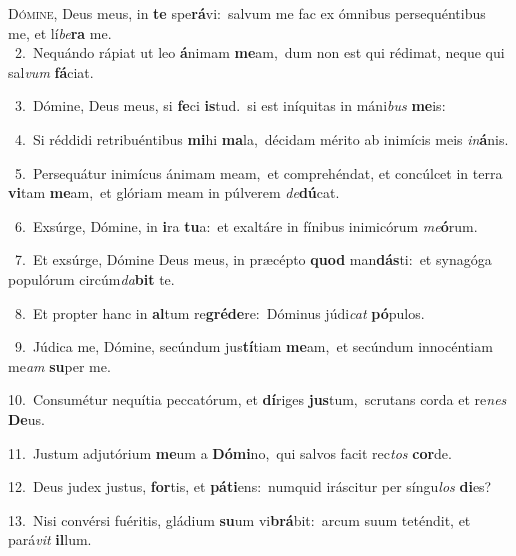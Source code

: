\lettrine{\initial\textcolor{\initialcolor}{D}}{ómine,} Deus meus, in \textbf{te} spe\-\textbf{rá}\-vi:~\star salvum me fac ex ómnibus persequéntibus me, et lí\-\textit{be}\-\textbf{ra} me.\\
{\numbfont\textcolor{\numbcolor}{~2.}}~Nequándo rápiat ut leo \textbf{á}\-nimam \textbf{me}\-am,~\star dum non est qui rédimat, neque qui sal\textit{vum} \textbf{fá}\-ciat.\par
{\numbfont\textcolor{\numbcolor}{~3.}}~Dómine, Deus meus, si \textbf{fe}\-ci \textbf{is}\-tud.~\star si est iníquitas in máni\textit{bus} \textbf{me}\-is:\par
{\numbfont\textcolor{\numbcolor}{~4.}}~Si réddidi retribuéntibus \textbf{mi}\-hi \textbf{ma}\-la,~\star décidam mérito ab inimícis meis \textit{in}\-\textbf{á}nis.\par
{\numbfont\textcolor{\numbcolor}{~5.}}~Persequátur inimícus ánimam meam,~\dagger et comprehéndat, et concúlcet in terra \textbf{vi}\-tam \textbf{me}\-am,~\star et glóriam meam in púlverem \textit{de}\-\textbf{dú}cat.\par
{\numbfont\textcolor{\numbcolor}{~6.}}~Exsúrge, Dómine, in \textbf{i}\-ra \textbf{tu}\-a:~\star et exaltáre in fínibus inimicórum \textit{me}\-\textbf{ó}rum.\par
{\numbfont\textcolor{\numbcolor}{~7.}}~Et exsúrge, Dómine Deus meus, in præcépto \textbf{quod} man\-\textbf{dás}\-ti:~\star et synagóga populórum circúm\-\textit{da}\-\textbf{bit} te.\par
{\numbfont\textcolor{\numbcolor}{~8.}}~Et propter hanc in \textbf{al}\-tum re\-\textbf{gré}\-\textbf{de}re:~\star Dóminus júdi\textit{cat} \textbf{pó}\-pulos.\par
{\numbfont\textcolor{\numbcolor}{~9.}}~Júdica me, Dómine, secúndum jus\-\textbf{tí}\-tiam \textbf{me}\-am,~\star et secúndum innocéntiam me\textit{am} \textbf{su}\-per me.\par
{\numbfont\textcolor{\numbcolor}{10.}}~Consumétur nequítia peccatórum, et \textbf{dí}\-riges \textbf{jus}\-tum,~\star scrutans corda et re\textit{nes} \textbf{De}\-us.\par
{\numbfont\textcolor{\numbcolor}{11.}}~Justum adjutórium \textbf{me}\-um a \textbf{Dó}\-\textbf{mi}no,~\star qui salvos facit rec\textit{tos} \textbf{cor}\-de.\par
{\numbfont\textcolor{\numbcolor}{12.}}~Deus judex justus, \textbf{for}\-tis, et \textbf{pá}\-\textbf{ti}ens:~\star numquid iráscitur per síngu\textit{los} \textbf{di}\-es?\par
{\numbfont\textcolor{\numbcolor}{13.}}~Nisi convérsi fuéritis, gládium \textbf{su}\-um vi\-\textbf{brá}\-bit:~\star arcum suum teténdit, et pará\textit{vit} \textbf{il}\-lum.\par
